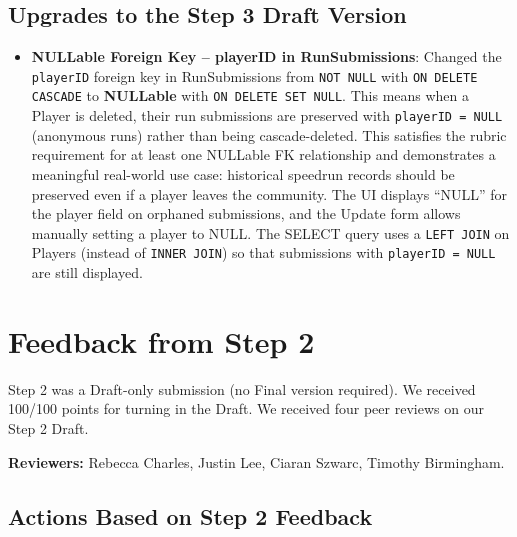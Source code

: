 \documentclass[11pt]{article}
\begin{document}
\subsection*{Upgrades to the Step 3 Draft Version}

\begin{itemize}[leftmargin=2em]
    \item \textbf{NULLable Foreign Key -- playerID in RunSubmissions}: Changed the \texttt{playerID} foreign key in RunSubmissions from \texttt{NOT NULL} with \texttt{ON DELETE CASCADE} to \textbf{NULLable} with \texttt{ON DELETE SET NULL}. This means when a Player is deleted, their run submissions are preserved with \texttt{playerID = NULL} (anonymous runs) rather than being cascade-deleted. This satisfies the rubric requirement for at least one NULLable FK relationship and demonstrates a meaningful real-world use case: historical speedrun records should be preserved even if a player leaves the community. The UI displays ``NULL'' for the player field on orphaned submissions, and the Update form allows manually setting a player to NULL. The SELECT query uses a \texttt{LEFT JOIN} on Players (instead of \texttt{INNER JOIN}) so that submissions with \texttt{playerID = NULL} are still displayed.
\end{itemize}

\hrulefill

\section*{Feedback from Step 2}

Step 2 was a Draft-only submission (no Final version required). We received 100/100 points for turning in the Draft. We received four peer reviews on our Step 2 Draft.

\textbf{Reviewers:} Rebecca Charles, Justin Lee, Ciaran Szwarc, Timothy Birmingham.

\subsection*{Actions Based on Step 2 Feedback}
\end{document}
